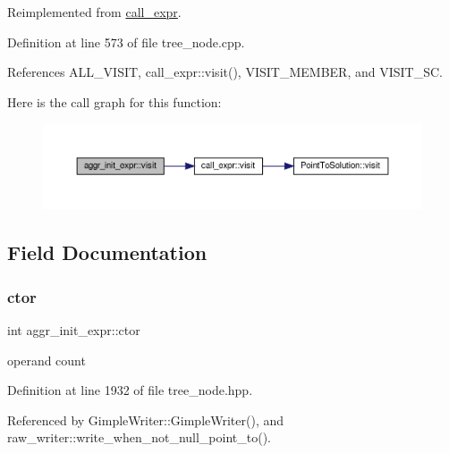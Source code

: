 Reimplemented from \hyperlink{structcall__expr_aeb0867ff82c5d47f5f86dd4e149f398f}{call\+\_\+expr}.



Definition at line 573 of file tree\+\_\+node.\+cpp.



References A\+L\+L\+\_\+\+V\+I\+S\+IT, call\+\_\+expr\+::visit(), V\+I\+S\+I\+T\+\_\+\+M\+E\+M\+B\+ER, and V\+I\+S\+I\+T\+\_\+\+SC.

Here is the call graph for this function\+:
\nopagebreak
\begin{figure}[H]
\begin{center}
\leavevmode
\includegraphics[width=350pt]{d4/dde/structaggr__init__expr_af28d5b47d09253a4ab8b59fbf776369d_cgraph}
\end{center}
\end{figure}


\subsection{Field Documentation}
\mbox{\label{structaggr__init__expr_a76134031ab5080a436b150b15a16637b}} 
\subsubsection{\texorpdfstring{ctor}{ctor}}
{\footnotesize\ttfamily int aggr\+\_\+init\+\_\+expr\+::ctor}



operand count 



Definition at line 1932 of file tree\+\_\+node.\+hpp.



Referenced by Gimple\+Writer\+::\+Gimple\+Writer(), and raw\+\_\+writer\+::write\+\_\+when\+\_\+not\+\_\+null\+\_\+point\+\_\+to().

\mbox{\label{structaggr__init__expr_a53f33ec3f4ee2f3b39a6f84d5c44396a}} 
